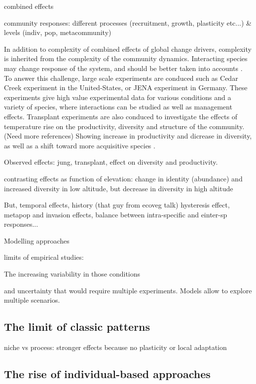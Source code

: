  combined effects
 
 community responses: different processes (recruitment, growth, plasticity etc...) \& levels (indiv, pop, metacommunity)
 

 In addition to complexity of combined effects of global change drivers, complexity is inherited from the complexity of the community dynamics. Interacting species may change response of the system, and should be better taken into accounts \parencite{gilman_framework_2010}. To answer this challenge, large scale experiments are conduced such as Cedar Creek experiment in the United-States, or JENA experiment in Germany. These experiments give high value experimental data for various conditions and a variety of species, where interactions can be studied as well as management effects.
 Transplant experiments are also conduced to investigate the effects of temperature rise on the productivity, diversity and structure of the community. (Need more references) Showing increase in productivity and dicrease in diversity, as well as a shift toward more acquisitive species \parencite{debouk_functional_2015}.
 
 Observed effects: jung, transplant, effect on diversity and productivity.
 
contrasting effects as function of elevation: change in identity (abundance) and increased diversity in low altitude, but decrease in diversity in high altitude \parencite{rosbakh_elevation_2014}
 
 But, temporal effects, history (that guy from ecoveg talk) hysteresis effect, metapop and invasion effects, balance between intra-specific and einter-sp responses...
 
 Modelling approaches   
 
 
limits of empirical studies: \parencite{merila_climate_2014}

 
 \parencite{schirpke_multiple_2012}

 The increasing variability in those conditions 
 
 and uncertainty that would require multiple experiments. Models allow to explore multiple scenarios.

\subsection{The limit of classic patterns}

niche vs process: stronger effects because no plasticity or local adaptation \cite{morin_comparing_2009}
\subsection{The rise of individual-based approaches}

